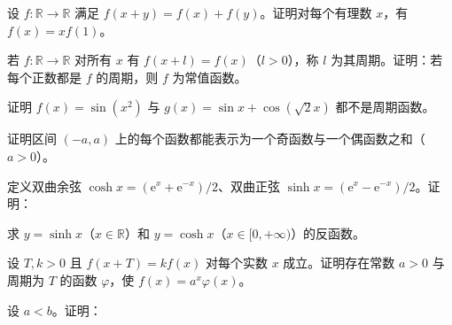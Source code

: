 \noindent\begin{minipage}{\textwidth}
设 $f:\mathbb R\to\mathbb R$ 满足 $f(x+y)=f(x)+f(y)$。证明对每个有理数 $x$，有 $f(x)=xf(1)$。
\end{minipage}\par\vfill
\noindent\begin{minipage}{\textwidth}
若 $f:\mathbb R\to\mathbb R$ 对所有 $x$ 有 $f(x+l)=f(x)$（$l>0$），称 $l$ 为其周期。证明：若每个正数都是 $f$ 的周期，则 $f$ 为常值函数。
\end{minipage}\par\vfill
\newpage
\noindent\begin{minipage}{\textwidth}
证明 $f(x)=\sin(x^2)$ 与 $g(x)=\sin x+\cos(\sqrt2x)$ 都不是周期函数。
\end{minipage}\par\vfill
\noindent\begin{minipage}{\textwidth}
证明区间 $(-a,a)$ 上的每个函数都能表示为一个奇函数与一个偶函数之和（$a>0$）。
\end{minipage}\par\vfill
\noindent\begin{minipage}{\textwidth}
定义双曲余弦 $\cosh x=(\mathrm e^x+\mathrm e^{-x})/2$、双曲正弦 $\sinh x=(\mathrm e^x-\mathrm e^{-x})/2$。证明：
\end{minipage}\par\vfill
\newpage
\noindent\begin{minipage}{\textwidth}
求 $y=\sinh x$（$x\in\mathbb R$）和 $y=\cosh x$（$x\in[0,+\infty)$）的反函数。
\end{minipage}\par\vfill
\noindent\begin{minipage}{\textwidth}
设 $T,k>0$ 且 $f(x+T)=kf(x)$ 对每个实数 $x$ 成立。证明存在常数 $a>0$ 与周期为 $T$ 的函数 $\varphi$，使 $f(x)=a^x\varphi(x)$。
\end{minipage}\par\vfill
\noindent\begin{minipage}{\textwidth}
设 $a<b$。证明：
\end{minipage}\par\vfill
